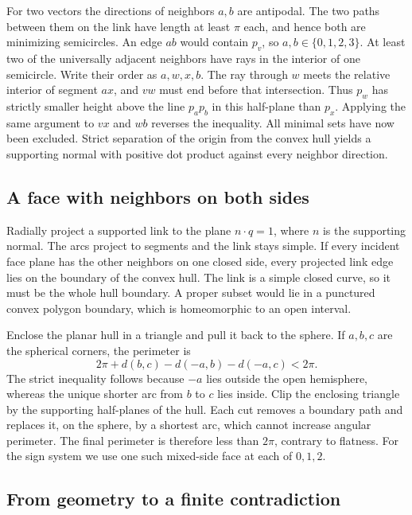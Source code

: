 \documentclass[11pt,letterpaper]{amsart}
\begin{document}
For two vectors the directions of neighbors \(a,b\) are antipodal.
The two paths between them on the link have length at least \(\pi\)
each, and hence both are minimizing semicircles. An edge \(ab\)
would contain \(p_v\), so \(a,b\in\{0,1,2,3\}\). At least two of the
universally adjacent neighbors have rays in the interior of one
semicircle. Write their order as \(a,w,x,b\). The ray through \(w\)
meets the relative interior of segment \(ax\), and \(vw\) must end
before that intersection. Thus \(p_w\) has strictly smaller height
above the line \(p_ap_b\) in this half-plane than \(p_x\). Applying
the same argument to \(vx\) and \(wb\) reverses the inequality.
All minimal sets have now been excluded. Strict separation of the
origin from the convex hull yields a supporting normal with positive
dot product against every neighbor direction.

\subsection*{A face with neighbors on both sides}

Radially project a supported link to the plane \(n\cdot q=1\), where
\(n\) is the supporting normal. The arcs project to segments and the
link stays simple. If every incident face plane has the other
neighbors on one closed side, every projected link edge lies on the
boundary of the convex hull. The link is a simple closed curve, so
it must be the whole hull boundary. A proper subset would lie in a
punctured convex polygon boundary, which is homeomorphic to an open
interval.

Enclose the planar hull in a triangle and pull it back to the
sphere. If \(a,b,c\) are the spherical corners, the perimeter is
\[
 2\pi + d(b,c)-d(-a,b)-d(-a,c)<2\pi.
\]
The strict inequality follows because \(-a\) lies outside the open
hemisphere, whereas the unique shorter arc from \(b\) to \(c\) lies
inside. Clip the enclosing triangle by the supporting half-planes
of the hull. Each cut removes a boundary path and replaces it, on
the sphere, by a shortest arc, which cannot increase angular
perimeter. The final perimeter is therefore less than \(2\pi\),
contrary to flatness. For the sign system we use one such mixed-side
face at each of \(0,1,2\).

\subsection*{From geometry to a finite contradiction}
\end{document}
